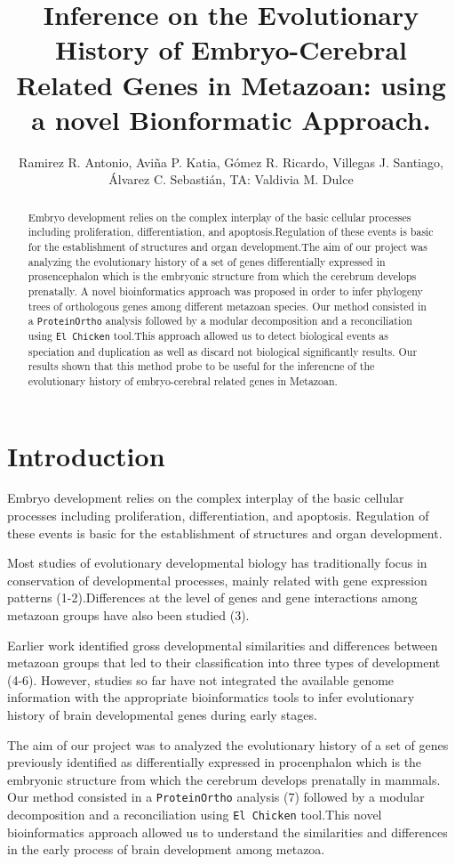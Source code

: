 \documentclass[a4paper]{article}
\title{Inference on the Evolutionary History of Embryo-Cerebral Related Genes in Metazoan: using a novel Bionformatic Approach.}
\author{Ramirez R. Antonio, Aviña P. Katia, Gómez R. Ricardo, Villegas J. Santiago, Álvarez C. Sebastián, TA: Valdivia M. Dulce}
\begin{document}
\maketitle

\begin{abstract}
Embryo development relies on the complex interplay of the basic cellular processes including proliferation, differentiation, and apoptosis.Regulation of these events is basic for the establishment of structures and organ development.The aim of our project was analyzing the evolutionary history of a set of genes differentially expressed in prosencephalon which is the embryonic structure from which the cerebrum develops prenatally. A novel bioinformatics approach was proposed in order to infer phylogeny trees of orthologous genes among different metazoan species. Our method consisted in a \texttt{ProteinOrtho} analysis followed by a modular decomposition and a reconciliation using \texttt{El Chicken} tool.This approach allowed us to detect biological events as speciation and duplication as well as discard not biological significantly results. Our results shown that this method probe to be useful for the inferencne of the evolutionary history of embryo-cerebral related genes in Metazoan. 


\end{abstract}

\section*{Introduction}
Embryo development relies on the complex interplay of the basic cellular processes including proliferation, differentiation, and apoptosis. Regulation of these events is basic for the establishment of structures and organ development.

Most studies of evolutionary developmental biology has traditionally focus in conservation of developmental processes, mainly related with gene expression patterns (1-2).Differences at the level of genes and gene interactions among metazoan groups have also been studied (3).

Earlier work identified gross developmental similarities and differences between metazoan groups that led to their classification into three types of development (4-6). However, studies so far have not integrated the available genome information with the appropriate bioinformatics tools to infer evolutionary history of brain developmental genes during early stages.

The aim of our project was to analyzed the evolutionary history of a set of genes previously identified as differentially expressed in procenphalon which is the embryonic structure from which the cerebrum develops prenatally in mammals. Our method consisted in a \texttt{ProteinOrtho} analysis (7) followed by a modular decomposition and a reconciliation using \texttt{El Chicken} tool.This novel bioinformatics approach allowed us to understand the similarities and differences in the early process of brain development among metazoa.
\end{document}
